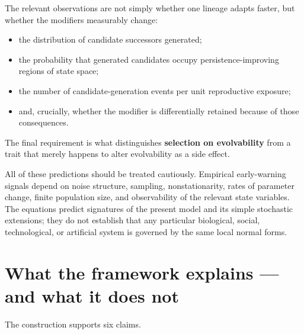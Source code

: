 \documentclass[11pt,a4paper]{article}
\providecommand{\tightlist}{%
  \setlength{\itemsep}{0pt}\setlength{\parskip}{0pt}}
\begin{document}
The relevant observations are not simply whether one lineage adapts
faster, but whether the modifiers measurably change:

\begin{itemize}
\tightlist
\item
  the distribution of candidate successors generated;
\item
  the probability that generated candidates occupy persistence-improving
  regions of state space;
\item
  the number of candidate-generation events per unit reproductive
  exposure;
\item
  and, crucially, whether the modifier is differentially retained
  because of those consequences.
\end{itemize}

The final requirement is what distinguishes \textbf{selection on
evolvability} from a trait that merely happens to alter evolvability as
a side effect.

All of these predictions should be treated cautiously. Empirical
early-warning signals depend on noise structure, sampling,
nonstationarity, rates of parameter change, finite population size, and
observability of the relevant state variables. The equations predict
signatures of the present model and its simple stochastic extensions;
they do not establish that any particular biological, social,
technological, or artificial system is governed by the same local normal
forms.

\section{What the framework explains --- and what it does
not}\label{what-the-framework-explains-and-what-it-does-not}

The construction supports six claims.
\end{document}
